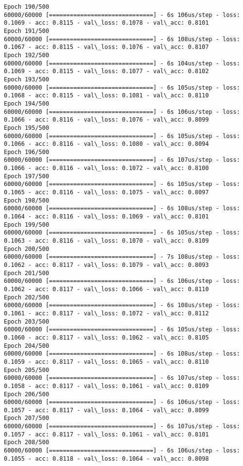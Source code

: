 \documentclass[11pt]{article}
\begin{document}
\begin{Verbatim}[commandchars=\\\{\}]
Epoch 190/500
60000/60000 [==============================] - 6s 106us/step - loss: 0.1069 - acc: 0.8115 - val\_loss: 0.1078 - val\_acc: 0.8101
Epoch 191/500
60000/60000 [==============================] - 6s 108us/step - loss: 0.1067 - acc: 0.8115 - val\_loss: 0.1076 - val\_acc: 0.8107
Epoch 192/500
60000/60000 [==============================] - 6s 104us/step - loss: 0.1069 - acc: 0.8115 - val\_loss: 0.1077 - val\_acc: 0.8102
Epoch 193/500
60000/60000 [==============================] - 6s 105us/step - loss: 0.1068 - acc: 0.8115 - val\_loss: 0.1081 - val\_acc: 0.8110
Epoch 194/500
60000/60000 [==============================] - 6s 106us/step - loss: 0.1066 - acc: 0.8116 - val\_loss: 0.1076 - val\_acc: 0.8099
Epoch 195/500
60000/60000 [==============================] - 6s 105us/step - loss: 0.1066 - acc: 0.8116 - val\_loss: 0.1080 - val\_acc: 0.8094
Epoch 196/500
60000/60000 [==============================] - 6s 107us/step - loss: 0.1066 - acc: 0.8116 - val\_loss: 0.1072 - val\_acc: 0.8100
Epoch 197/500
60000/60000 [==============================] - 6s 105us/step - loss: 0.1065 - acc: 0.8116 - val\_loss: 0.1075 - val\_acc: 0.8097
Epoch 198/500
60000/60000 [==============================] - 6s 108us/step - loss: 0.1064 - acc: 0.8116 - val\_loss: 0.1069 - val\_acc: 0.8101
Epoch 199/500
60000/60000 [==============================] - 6s 105us/step - loss: 0.1063 - acc: 0.8116 - val\_loss: 0.1070 - val\_acc: 0.8109
Epoch 200/500
60000/60000 [==============================] - 7s 108us/step - loss: 0.1062 - acc: 0.8117 - val\_loss: 0.1079 - val\_acc: 0.8093
Epoch 201/500
60000/60000 [==============================] - 6s 106us/step - loss: 0.1062 - acc: 0.8117 - val\_loss: 0.1066 - val\_acc: 0.8110
Epoch 202/500
60000/60000 [==============================] - 6s 108us/step - loss: 0.1061 - acc: 0.8117 - val\_loss: 0.1072 - val\_acc: 0.8112
Epoch 203/500
60000/60000 [==============================] - 6s 105us/step - loss: 0.1060 - acc: 0.8117 - val\_loss: 0.1062 - val\_acc: 0.8105
Epoch 204/500
60000/60000 [==============================] - 6s 108us/step - loss: 0.1059 - acc: 0.8117 - val\_loss: 0.1065 - val\_acc: 0.8110
Epoch 205/500
60000/60000 [==============================] - 6s 107us/step - loss: 0.1058 - acc: 0.8117 - val\_loss: 0.1061 - val\_acc: 0.8109
Epoch 206/500
60000/60000 [==============================] - 6s 106us/step - loss: 0.1057 - acc: 0.8117 - val\_loss: 0.1064 - val\_acc: 0.8099
Epoch 207/500
60000/60000 [==============================] - 6s 107us/step - loss: 0.1057 - acc: 0.8117 - val\_loss: 0.1061 - val\_acc: 0.8101
Epoch 208/500
60000/60000 [==============================] - 6s 106us/step - loss: 0.1055 - acc: 0.8118 - val\_loss: 0.1064 - val\_acc: 0.8098

\end{Verbatim}
\end{document}
